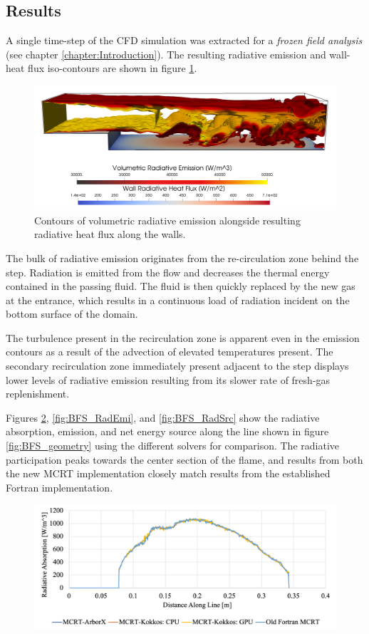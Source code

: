 \subsection{Results}
A single time-step of the CFD simulation was extracted for a \textit{frozen field analysis} (see chapter \ref{chapter:Introduction}). 
The resulting radiative emission and wall-heat flux iso-contours are shown in figure \ref{fig:BFS_radiationcontours}.
\begin{figure}
\includegraphics[width=\linewidth]{figures/ch4/BFS_volwallflux3.png}
\caption{Contours of volumetric radiative emission alongside resulting radiative heat flux along the walls.}
\label{fig:BFS_radiationcontours}
\end{figure}
The bulk of radiative emission originates from the re-circulation zone behind the step. Radiation is emitted from the flow and decreases the thermal energy contained in the passing fluid. 
The fluid is then quickly replaced by the new gas at the entrance, which results in a continuous load of radiation incident on the bottom surface of the domain. 

The turbulence present in the recirculation zone is apparent even in the emission contours as a result of the advection of elevated temperatures present. The secondary recirculation zone immediately present adjacent to the step displays lower levels of radiative emission resulting from its slower rate of fresh-gas replenishment.

Figures \ref{fig:BFS_RadAbs}, \ref{fig:BFS_RadEmi}, and \ref{fig:BFS_RadSrc} show the radiative absorption, emission, and net energy source along the line shown in figure \ref{fig:BFS_geometry} using the different solvers for comparison. 
The radiative participation peaks towards the center section of the flame, and results from both the new MCRT implementation closely match results from the established Fortran implementation.

\begin{figure}[!ht]
\includegraphics[width=\linewidth]{figures/ch4/LineComparison_RadAbs.png}
\caption{}
\label{fig:BFS_RadAbs}
\end{figure}

